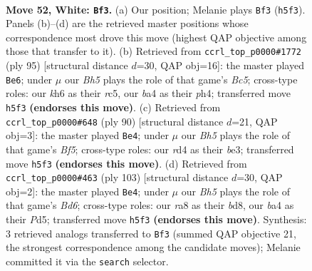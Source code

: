 \documentclass[11pt]{article}
\begin{document}
\clearpage

\begin{figure}[p]\centering
\begin{subfigure}{0.46\textwidth}\centering
\resizebox{\linewidth}{!}{%
\newchessgame
\chessboard[
  setfen={r7/8/pp5k/4R2B/bP1r4/P6K/8/5R2 w - - 6 52},
  showmover=false,
  pgfstyle=straightmove, color=movearrow, markmove={h5-f3}
]}
\caption{}
\end{subfigure}\hfill
\begin{subfigure}{0.46\textwidth}\centering
\resizebox{\linewidth}{!}{%
\newchessgame
\chessboard[
  setfen={5k2/8/5p2/2R1p3/2b1P2P/r7/5K2/1B6 b - - 7 48},
  showmover=false,
  pgfstyle=straightmove, color=movearrow, markmove={c4-e6}
]}
\caption{}
\end{subfigure}
\\[4pt]
\begin{subfigure}{0.46\textwidth}\centering
\resizebox{\linewidth}{!}{%
\newchessgame
\chessboard[
  setfen={8/1pk5/5R2/r4B1p/7P/4b1P1/8/7K w - - 0 46},
  showmover=false,
  pgfstyle=straightmove, color=movearrow, markmove={f5-e4}
]}
\caption{}
\end{subfigure}\hfill
\begin{subfigure}{0.46\textwidth}\centering
\resizebox{\linewidth}{!}{%
\newchessgame
\chessboard[
  setfen={3B4/1p3R2/8/P2p4/3P2k1/3b4/1r6/3K4 b - - 10 52},
  showmover=false,
  pgfstyle=straightmove, color=movearrow, markmove={d3-e4}
]}
\caption{}
\end{subfigure}
\caption{\textbf{Move 52, White: \texttt{Bf3}.} (a) Our position; Melanie plays \texttt{Bf3} (\texttt{h5f3}). Panels (b)--(d) are the retrieved master positions whose correspondence most drove this move (highest QAP objective among those that transfer to it). (b) Retrieved from \texttt{ccrl\_top\_p0000\#1772} (ply 95) [structural distance $d$=30, QAP obj=16]: the master played \texttt{Be6}; under $\mu$ our \emph{Bh5} plays the role of that game's \emph{Bc5}; cross-type roles: our \emph{k}h6 as their \emph{r}c5, our \emph{b}a4 as their \emph{p}h4; transferred move \texttt{h5f3} \textbf{(endorses this move)}. (c) Retrieved from \texttt{ccrl\_top\_p0000\#648} (ply 90) [structural distance $d$=21, QAP obj=3]: the master played \texttt{Be4}; under $\mu$ our \emph{Bh5} plays the role of that game's \emph{Bf5}; cross-type roles: our \emph{r}d4 as their \emph{b}e3; transferred move \texttt{h5f3} \textbf{(endorses this move)}. (d) Retrieved from \texttt{ccrl\_top\_p0000\#463} (ply 103) [structural distance $d$=30, QAP obj=2]: the master played \texttt{Be4}; under $\mu$ our \emph{Bh5} plays the role of that game's \emph{Bd6}; cross-type roles: our \emph{r}a8 as their \emph{b}d8, our \emph{b}a4 as their \emph{P}d5; transferred move \texttt{h5f3} \textbf{(endorses this move)}. Synthesis: 3 retrieved analogs transferred to \texttt{Bf3} (summed QAP objective 21, the strongest correspondence among the candidate moves); Melanie committed it via the \texttt{search} selector.}
\label{fig:thought-m102}
\end{figure}
\end{document}
